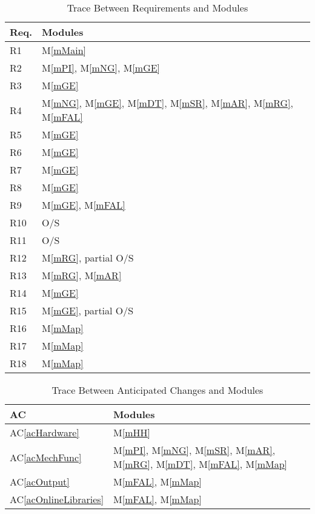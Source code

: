 \documentclass[12pt, titlepage]{article}
\newcommand{\acref}[1]{AC\ref{#1}}
\newcommand{\mref}[1]{M\ref{#1}}
\begin{document}
\begin{table}[H]
\centering
\begin{tabular}{p{} p{}}
\toprule
\textbf{Req.} & \textbf{Modules}\\
\midrule
R1 & \mref{mMain}\\
R2 & \mref{mPI}, \mref{mNG}, \mref{mGE}\\
R3 & \mref{mGE}\\
R4 & \mref{mNG}, \mref{mGE}, \mref{mDT}, \mref{mSR}, \mref{mAR}, \mref{mRG}, \mref{mFAL}\\
R5 & \mref{mGE}\\
R6 & \mref{mGE}\\
R7 & \mref{mGE}\\
R8 & \mref{mGE}\\
R9 & \mref{mGE}, \mref{mFAL}\\
R10 & O/S\\
R11 & O/S\\
R12 & \mref{mRG}, partial O/S\\
R13 & \mref{mRG}, \mref{mAR}\\
R14 & \mref{mGE}\\
R15 & \mref{mGE}, partial O/S\\
R16 & \mref{mMap}\\
R17 & \mref{mMap}\\
R18 & \mref{mMap}\\
\bottomrule
\end{tabular}
\caption{Trace Between Requirements and Modules}
\label{TblRT}
\end{table}

\begin{table}[H]
\centering
\begin{tabular}{p{} p{}}
\toprule
\textbf{AC} & \textbf{Modules}\\
\midrule
\acref{acHardware} & \mref{mHH}\\
\acref{acMechFunc} & \mref{mPI}, \mref{mNG}, \mref{mSR}, \mref{mAR}, \mref{mRG}, \mref{mDT}, \mref{mFAL}, \mref{mMap}\\
\acref{acOutput} & \mref{mFAL}, \mref{mMap}\\
\acref{acOnlineLibraries} & \mref{mFAL}, \mref{mMap}\\
\bottomrule
\end{tabular}
\caption{Trace Between Anticipated Changes and Modules}
\label{TblACT}
\end{table}
\end{document}
